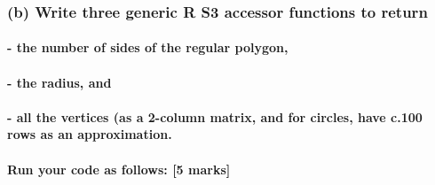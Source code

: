 \documentclass[]{article}
\newenvironment{Shaded}{\begin{snugshade}}{\end{snugshade}}
\newcommand{\KeywordTok}[1]{\textcolor[rgb]{0.13,0.29,0.53}{\textbf{#1}}}
\newcommand{\DataTypeTok}[1]{\textcolor[rgb]{0.13,0.29,0.53}{#1}}
\newcommand{\DecValTok}[1]{\textcolor[rgb]{0.00,0.00,0.81}{#1}}
\newcommand{\StringTok}[1]{\textcolor[rgb]{0.31,0.60,0.02}{#1}}
\newcommand{\ControlFlowTok}[1]{\textcolor[rgb]{0.13,0.29,0.53}{\textbf{#1}}}
\newcommand{\OperatorTok}[1]{\textcolor[rgb]{0.81,0.36,0.00}{\textbf{#1}}}
\newcommand{\NormalTok}[1]{#1}
\let\oldparagraph\paragraph
\renewcommand{\paragraph}[1]{\oldparagraph{#1}\mbox{}}
\begin{document}
\subsubsection{(b) Write three generic R S3 accessor functions to
return}\label{b-write-three-generic-r-s3-accessor-functions-to-return}

\paragraph{- the number of sides of the regular
polygon,}\label{the-number-of-sides-of-the-regular-polygon}

\paragraph{- the radius, and}\label{the-radius-and}

\paragraph{- all the vertices (as a 2-column matrix, and for circles,
have c.100 rows as an
approximation.}\label{all-the-vertices-as-a-2-column-matrix-and-for-circles-have-c.100-rows-as-an-approximation.}

\paragraph{Run your code as follows: {[}5
marks{]}}\label{run-your-code-as-follows-5-marks}

\begin{Shaded}
\end{Shaded}
\end{document}
